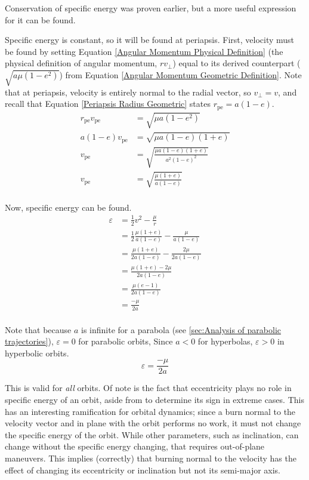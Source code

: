 \documentclass[../main.tex]{subfiles}
\begin{document}
Conservation of specific energy was proven earlier, but a more useful expression for it can be found.

Specific energy is constant, so it will be found at periapsis. First, velocity must be found by setting Equation \eqref{Angular Momentum Physical Definition} (the physical definition of angular momentum, $rv_\perp$) equal to its derived counterpart ($\sqrt{a\mu(1-e^2)}$) from Equation \eqref{Angular Momentum Geometric Definition}. Note that at periapsis, velocity is entirely normal to the radial vector, so $v_\perp=v$, and recall that Equation \eqref{Periapsis Radius Geometric} states $r_\text{pe}=a(1-e)$.
\begin{align*}
    r_\text{pe}v_\text{pe} & = \sqrt{\mu{}a(1-e^2)}                       \\
    a(1-e)v_\text{pe}      & = \sqrt{\mu{}a(1-e)(1+e)}                    \\
    v_\text{pe}            & = \sqrt{\frac{\mu{}a(1-e)(1+e)}{a^2(1-e)^2}} \\
    v_\text{pe}            & = \sqrt{\frac{\mu{}(1+e)}{a(1-e)}}           \\
\end{align*}

Now, specific energy can be found.
\begin{align*}
    \varepsilon & = \frac{1}{2}v^2-\frac{\mu}{r}                            \\
                & = \frac{1}{2}\frac{\mu{}(1+e)}{a(1-e)}-\frac{\mu}{a(1-e)} \\
                & = \frac{\mu{}(1+e)}{2a(1-e)}-\frac{2\mu}{2a(1-e)}         \\
                & = \frac{\mu{}(1+e)-2\mu}{2a(1-e)}                         \\
                & = \frac{\mu{}(e-1)}{2a(1-e)}                              \\
                & = \frac{-\mu}{2a}                                         \\
\end{align*}

Note that because $a$ is infinite for a parabola (see \ref{sec:Analysis of parabolic trajectories}), $\varepsilon=0$ for parabolic orbits, Since $a<0$ for hyperbolas, $\varepsilon>0$ in hyperbolic orbits.
\begin{equation}\label{Specific Energy Geometric}
    \varepsilon=\frac{-\mu}{2a}
\end{equation}

This is valid for \textit{all} orbits. Of note is the fact that eccentricity plays no role in specific energy of an orbit, aside from to determine its sign in extreme cases. This has an interesting ramification for orbital dynamics; since a burn normal to the velocity vector and in plane with the orbit performs no work, it must not change the specific energy of the orbit. While other parameters, such as inclination, can change without the specific energy changing, that requires out-of-plane maneuvers. This implies (correctly) that burning normal to the velocity has the effect of changing its eccentricity or inclination but not its semi-major axis.
\end{document}
